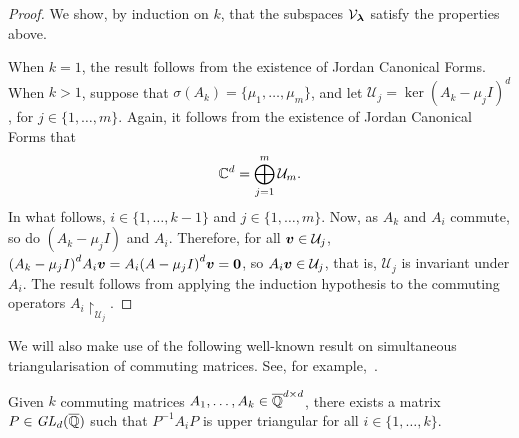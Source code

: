 \begin{proof}
We show, by induction on $k$, that the subspaces $\mathcal{V}_{\boldsymbol{\lambda}}$ satisfy the properties above.

When $k = 1$, the result follows from the existence of Jordan Canonical Forms. When $k > 1$, suppose that $\sigma(A_{k}) = \lbrace \mu_{1}, \ldots, \mu_{m} \rbrace$, and let $\mathcal{U}_{j} = \ker{(A_{k} - \mu_{j} I)}^{d}$, for $j \in \lbrace 1, \ldots, m \rbrace$. Again, it follows from the existence of Jordan Canonical Forms that
\begin{align*}
\mathbb{C}^{d} = \bigoplus \limits_{j = 1}^{m} \mathcal{U}_{m} .
\end{align*}
In what follows, $i \in \lbrace 1, \ldots, k-1 \rbrace$ and $j \in \lbrace 1, \ldots, m \rbrace$. Now, as $A_{k}$ and $A_{i}$ commute, so do $(A_{k}-\mu_{j} I)$ and $A_{i}$. Therefore, for all $\boldsymbol{v} \in \mathcal{U}_{j}$, ${(A_{k} - \mu_{j} I)}^{d} A_{i} \boldsymbol{v} = A_{i} {(A-\mu_{j} I)}^{d} \boldsymbol{v} = \boldsymbol{0}$, so $A_{i} \boldsymbol{v} \in \mathcal{U}_{j}$, that is, $\mathcal{U}_{j}$ is invariant under $A_{i}$. The result follows from applying the induction hypothesis to the commuting operators $A_{i} \restriction_{\mathcal{U}_{j}}$.
\end{proof}

We will also make use of the following well-known result on simultaneous triangularisation of commuting matrices. See, for example,~\cite{CommutingMatrices}.

\begin{theorem}
\label{thm:simultaneous-triangularisation}
Given $k$ commuting matrices $A_{1}, \ldots, A_{k} \in \overline{\mathbb{Q}}^{d \times d}$, there exists a matrix $P \in \mathit{GL}_{d}(\overline{\mathbb{Q}})$ such that $P^{-1}A_{i}P$ is upper triangular for all $i \in \lbrace 1, \ldots, k \rbrace$.
\end{theorem}
